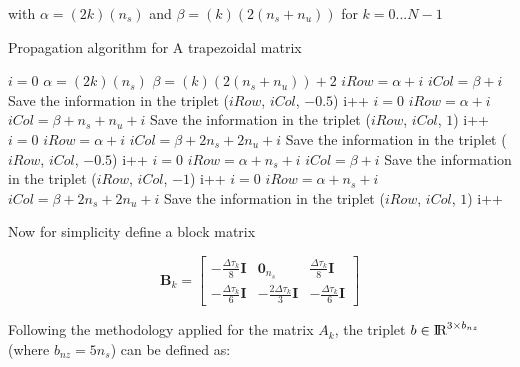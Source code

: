 \documentclass[12pt]{article}
\newcommand{\real}{\mbox{\rm I$\!$R}}
\begin{document}
\noindent with $\alpha=(2k)(n_s)$ and $\beta=(k)(2(n_s+n_u))$ for $k=0...N-1$
%
\begin{algorithm}
	\caption{Propagation algorithm for A trapezoidal matrix} 
	\begin{algorithmic}[1]
		    \State $i=0$
		    \State $\alpha=(2k)(n_s)$
		    \State $\beta=(k)(2(n_s+n_u))+2$
			    \State $iRow=\alpha+i$
			    \State $iCol=\beta+i$
				\State Save the information in the triplet ($iRow$, $iCol$, $-0.5$)
				\State i++
			\EndFor
			\State $i=0$
			    \State $iRow=\alpha+i$
			    \State $iCol=\beta+n_s+n_u+i$
				\State Save the information in the triplet ($iRow$, $iCol$, $1$)
				\State i++
			\EndFor
			\State $i=0$
			    \State $iRow=\alpha+i$
			    \State $iCol=\beta+2n_s+2n_u+i$
				\State Save the information in the triplet ($iRow$, $iCol$, $-0.5$)
				\State i++
			\EndFor
			\State $i=0$
			    \State $iRow=\alpha+n_s+i$
			    \State $iCol=\beta+i$
				\State Save the information in the triplet ($iRow$, $iCol$, $-1$)
				\State i++
			\EndFor
			\State $i=0$
			    \State $iRow=\alpha+n_s+i$
			    \State $iCol=\beta+2n_s+2n_u+i$
				\State Save the information in the triplet ($iRow$, $iCol$, $1$)
				\State i++
			\EndFor
			
		\EndFor
	\end{algorithmic} 
\end{algorithm}
%
\newpage
\noindent Now for simplicity define a block matrix

\begin{equation}
\bm{B}_k=\begin{bmatrix}
 -\frac{\Delta \tau_k}{8}\bm{I}& \bm{0}_{n_s} & \frac{\Delta \tau_k}{8}\bm{I} \\ 
 -\frac{\Delta \tau_k}{6}\bm{I}& -\frac{2\Delta \tau_k}{3}\bm{I} & -\frac{\Delta \tau_k}{6}\bm{I}
\end{bmatrix} \nonumber
\end{equation}

\noindent Following the methodology applied for the matrix $A_k$, the triplet $b \in \real^{3\times b_{nz}}$ (where $b_{nz}=5n_s$) can be defined as:
\end{document}
